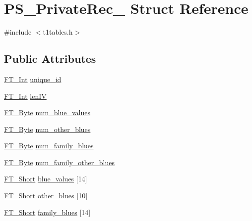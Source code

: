 \hypertarget{struct_p_s___private_rec__}{\section{P\-S\-\_\-\-Private\-Rec\-\_\- Struct Reference}
\label{struct_p_s___private_rec__}
}


{\ttfamily \#include $<$t1tables.\-h$>$}

\subsection*{Public Attributes}
\begin{DoxyCompactItemize}
\item 
\hyperlink{fttypes_8h_af90e5fb0d07e21be9fe6faa33f02484c}{F\-T\-\_\-\-Int} \hyperlink{struct_p_s___private_rec___ae862c1db170cfee85aa3242be9fa5d57}{unique\-\_\-id}
\item 
\hyperlink{fttypes_8h_af90e5fb0d07e21be9fe6faa33f02484c}{F\-T\-\_\-\-Int} \hyperlink{struct_p_s___private_rec___a796ebb92d96f0297ae584a911768db8b}{len\-I\-V}
\item 
\hyperlink{fttypes_8h_a51f26183ca0c9f4af958939648caeccd}{F\-T\-\_\-\-Byte} \hyperlink{struct_p_s___private_rec___ae3c56e75b5674451a7296cbb9f0a2e40}{num\-\_\-blue\-\_\-values}
\item 
\hyperlink{fttypes_8h_a51f26183ca0c9f4af958939648caeccd}{F\-T\-\_\-\-Byte} \hyperlink{struct_p_s___private_rec___a149acdf871b0739f7ab13b1ac8e48a28}{num\-\_\-other\-\_\-blues}
\item 
\hyperlink{fttypes_8h_a51f26183ca0c9f4af958939648caeccd}{F\-T\-\_\-\-Byte} \hyperlink{struct_p_s___private_rec___a1e8a432c78f00034c73cfc54c787b10f}{num\-\_\-family\-\_\-blues}
\item 
\hyperlink{fttypes_8h_a51f26183ca0c9f4af958939648caeccd}{F\-T\-\_\-\-Byte} \hyperlink{struct_p_s___private_rec___a7370e2e89f39f7ff8923f3d1befbcfce}{num\-\_\-family\-\_\-other\-\_\-blues}
\item 
\hyperlink{fttypes_8h_aa7279be89046a2563cd3d4d6651fbdcf}{F\-T\-\_\-\-Short} \hyperlink{struct_p_s___private_rec___ae2c23ed06e54b680473f924483685425}{blue\-\_\-values} \mbox{[}14\mbox{]}
\item 
\hyperlink{fttypes_8h_aa7279be89046a2563cd3d4d6651fbdcf}{F\-T\-\_\-\-Short} \hyperlink{struct_p_s___private_rec___a6da97f89e174d621936c75fe9b463e65}{other\-\_\-blues} \mbox{[}10\mbox{]}
\item 
\hyperlink{fttypes_8h_aa7279be89046a2563cd3d4d6651fbdcf}{F\-T\-\_\-\-Short} \hyperlink{struct_p_s___private_rec___aa6645b5810e4e8b7d1a8b57300cdf406}{family\-\_\-blues} \mbox{[}14\mbox{]}

\end{DoxyCompactItemize}
